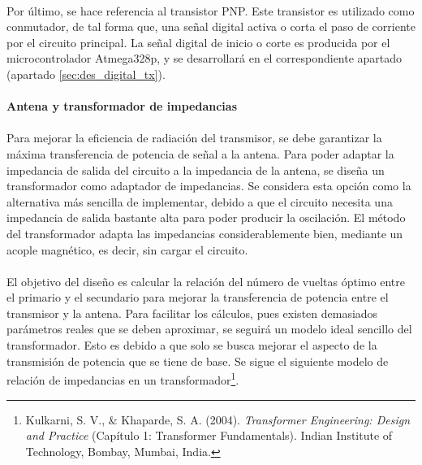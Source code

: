 \paragraph{} 
Por último, se hace referencia al transistor PNP. %
Este transistor es utilizado como conmutador, de tal forma que, una señal digital activa o corta el paso de corriente por el circuito principal. La señal digital de inicio o corte es producida por el microcontrolador Atmega328p, y se desarrollará en el correspondiente apartado (apartado \ref{sec:des_digital_tx}).

\paragraph{}
\paragraph{Antena y transformador de impedancias} 
\paragraph{}
Para mejorar la eficiencia de radiación del transmisor, se debe garantizar la máxima transferencia de potencia de señal a la antena.
Para poder adaptar la impedancia de salida del circuito a la impedancia de la antena, se diseña un transformador como adaptador de impedancias. 
Se considera esta opción como la alternativa más sencilla de implementar, debido a que el circuito necesita una impedancia de salida bastante alta para poder producir la oscilación.
El método del transformador adapta las impedancias considerablemente bien, mediante un acople magnético, es decir, sin cargar el circuito.
\paragraph{}
El objetivo del diseño es calcular la relación del número de vueltas óptimo entre el primario y el secundario para mejorar la transferencia de potencia entre el transmisor y la antena. 
Para facilitar los cálculos, pues existen demasiados parámetros reales que se deben aproximar, se seguirá un modelo ideal sencillo del transformador. Esto es debido a que solo se busca mejorar el aspecto de la transmisión de potencia que se tiene de base.
Se sigue el siguiente modelo de relación de impedancias en un transformador\footnote{Kulkarni, S. V., \& Khaparde, S. A. (2004). \textit{Transformer Engineering: Design and Practice} (Capítulo 1: Transformer Fundamentals). Indian Institute of Technology, Bombay, Mumbai, India.}.

